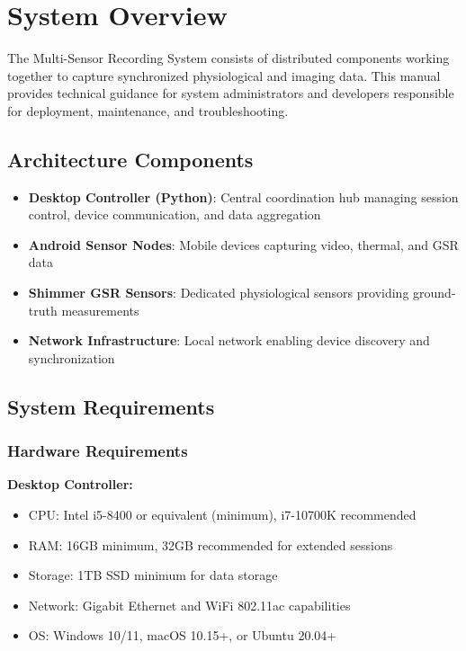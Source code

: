 \section{System Overview}

The Multi-Sensor Recording System consists of distributed components working together to capture synchronized physiological and imaging data. This manual provides technical guidance for system administrators and developers responsible for deployment, maintenance, and troubleshooting.

\subsection{Architecture Components}

\begin{itemize}
\item \textbf{Desktop Controller (Python)}: Central coordination hub managing session control, device communication, and data aggregation
\item \textbf{Android Sensor Nodes}: Mobile devices capturing video, thermal, and GSR data
\item \textbf{Shimmer GSR Sensors}: Dedicated physiological sensors providing ground-truth measurements
\item \textbf{Network Infrastructure}: Local network enabling device discovery and synchronization
\end{itemize}

\subsection{System Requirements}

\subsubsection{Hardware Requirements}

\textbf{Desktop Controller:}
\begin{itemize}
\item CPU: Intel i5-8400 or equivalent (minimum), i7-10700K recommended
\item RAM: 16GB minimum, 32GB recommended for extended sessions
\item Storage: 1TB SSD minimum for data storage
\item Network: Gigabit Ethernet and WiFi 802.11ac capabilities
\item OS: Windows 10/11, macOS 10.15+, or Ubuntu 20.04+
\end{itemize}


